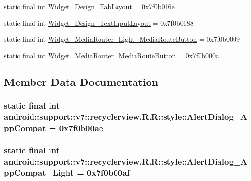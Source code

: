 \begin{CompactItemize}
\item 
static final int \hyperlink{classandroid_1_1support_1_1v7_1_1recyclerview_1_1_r_1_1style_a9a1bafd354cb0f21bdfc409741f3367}{Widget\_\-Design\_\-TabLayout} = 0x7f0b016e
\item 
static final int \hyperlink{classandroid_1_1support_1_1v7_1_1recyclerview_1_1_r_1_1style_715f39e369f28521d815494e7de34411}{Widget\_\-Design\_\-TextInputLayout} = 0x7f0b0188
\item 
static final int \hyperlink{classandroid_1_1support_1_1v7_1_1recyclerview_1_1_r_1_1style_6cd26a08a6acb093365c07da3f24de03}{Widget\_\-MediaRouter\_\-Light\_\-MediaRouteButton} = 0x7f0b0009
\item 
static final int \hyperlink{classandroid_1_1support_1_1v7_1_1recyclerview_1_1_r_1_1style_3e6070863c794118f6f2dcc4d4b36898}{Widget\_\-MediaRouter\_\-MediaRouteButton} = 0x7f0b000a
\end{CompactItemize}


\subsection{Member Data Documentation}
\hypertarget{classandroid_1_1support_1_1v7_1_1recyclerview_1_1_r_1_1style_336e1c17b382df3a70eeb6d16eacc2d7}{
\subsubsection[{AlertDialog\_\-AppCompat}]{\setlength{\rightskip}{0pt plus 5cm}static final int android::support::v7::recyclerview.R.R::style::AlertDialog\_\-AppCompat = 0x7f0b00ae}}
\label{classandroid_1_1support_1_1v7_1_1recyclerview_1_1_r_1_1style_336e1c17b382df3a70eeb6d16eacc2d7}


\hypertarget{classandroid_1_1support_1_1v7_1_1recyclerview_1_1_r_1_1style_971051b19882505dcc5ae22f858a5225}{
\subsubsection[{AlertDialog\_\-AppCompat\_\-Light}]{\setlength{\rightskip}{0pt plus 5cm}static final int android::support::v7::recyclerview.R.R::style::AlertDialog\_\-AppCompat\_\-Light = 0x7f0b00af}}
\label{classandroid_1_1support_1_1v7_1_1recyclerview_1_1_r_1_1style_971051b19882505dcc5ae22f858a5225}



